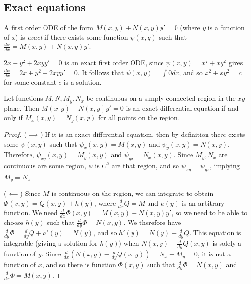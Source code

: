 \subsection{Exact equations}

\begin{defn}
    A first order ODE of the form $M(x, y) + N(x, y)y' = 0$ (where $y$ is a function of $x$) is \emph{exact} if there exists some function $\psi(x, y)$ such that $\frac{d\psi}{dx} = M(x, y) + N(x, y)y'$.
\end{defn}

\begin{exmp}
    $2x + y^2 + 2xyy' = 0$ is an exact first order ODE, since $\psi(x, y) = x^2 + xy^2$ gives $\frac{d\psi}{dx} = 2x + y^2 + 2xyy' = 0$. It follows that $\psi(x, y) = \int{0}dx$, and so $x^2 + xy^2 = c$ for some constant $c$ is a solution.
\end{exmp}

\begin{thm}
    Let functions $M, N, M_y, N_x$ be continuous on a simply connected region in the $xy$ plane. Then $M(x, y) + N(x, y)y' = 0$ is an exact differential equation if and only if $M_x(x, y) = N_y(x, y)$ for all points on the region.
\end{thm}

\begin{proof}\proofbreak
    ($\implies$) If it is an exact differential equation, then by definition there exists some $\psi(x, y)$ such that $\psi_x(x, y) = M(x, y)$ and $\psi_y(x, y) = N(x, y)$. Therefore, $\psi_{xy}(x, y) = M_y(x, y)$ and $\psi_{yx} = N_x(x, y)$. Since $M_y, N_x$ are continuous are some region, $\psi$ is $C^2$ are that region, and so $\psi_{xy} = \psi_{yx}$, implying $M_y = N_x$.

    ($\impliedby$) Since $M$ is continuous on the region, we can integrate to obtain $\varPhi(x, y) = Q(x, y) + h(y)$, where $\frac{d}{dx}Q = M$ and $h(y)$ is an arbitrary function. We need $\frac{d}{dx}\varPhi(x, y) = M(x, y) + N(x, y)y'$, so we need to be able to choose $h(y)$ such that $\frac{d}{dy}\varPhi = N(x,y)$. We therefore have $\frac{d}{dy}\varPhi = \frac{d}{dy}Q + h'(y) = N(y)$, and so $h'(y) = N(y) - \frac{d}{dy}Q$. This equation is integrable (giving a solution for $h(y)$) when $N(x,y) - \frac{d}{dy}Q(x,y)$ is solely a function of $y$. Since $\frac{d}{dx}\left(N(x,y) - \frac{d}{dy}Q(x,y)\right) = N_x - M_y = 0$, it is not a function of $x$, and so there is function $\varPhi(x,y)$ such that $\frac{d}{dy}\varPhi = N(x,y)$ and $\frac{d}{dx}\varPhi = M(x,y)$.
\end{proof}

